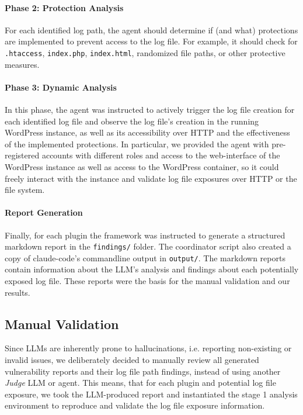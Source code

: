 \documentclass[sigconf]{acmart}
\begin{document}
\paragraph{Phase 2: Protection Analysis}
For each identified log path, the agent should determine if (and what) protections are implemented to prevent access to the log file. 
For example, it should check for \texttt{.htaccess}, \texttt{index.php}, \texttt{index.html}, randomized file paths, or other protective measures.

\paragraph{Phase 3: Dynamic Analysis}
In this phase, the agent was instructed to actively trigger the log file creation for each identified log file and observe the log file's creation in the running WordPress instance, as well as its accessibility over HTTP and the effectiveness of the implemented protections.
In particular, we provided the agent with pre-registered accounts with different roles and access to the web-interface of the WordPress instance as well as access to the WordPress container, so it could freely interact with the instance and validate log file exposures over HTTP or the file system.

\paragraph{Report Generation}
Finally, for each plugin the framework was instructed to generate a structured markdown report in the \texttt{findings/} folder. 
The coordinator script also created a copy of claude-code's commandline output in \texttt{output/}.
The markdown reports contain information about the LLM's analysis and findings about each potentially exposed log file. 
These reports were the basis for the manual validation and our results.


\subsection{Manual Validation}\label{sec:meth:validation}
Since LLMs are inherently prone to hallucinations, i.e. reporting non-existing or invalid issues, we deliberately decided to manually review all generated vulnerability reports and their log file path findings, instead of using another \emph{Judge} LLM or agent.
This means, that for each plugin and potential log file exposure, we took the LLM-produced report and instantiated the stage 1 analysis environment to reproduce and validate the log file exposure information. 
\end{document}
